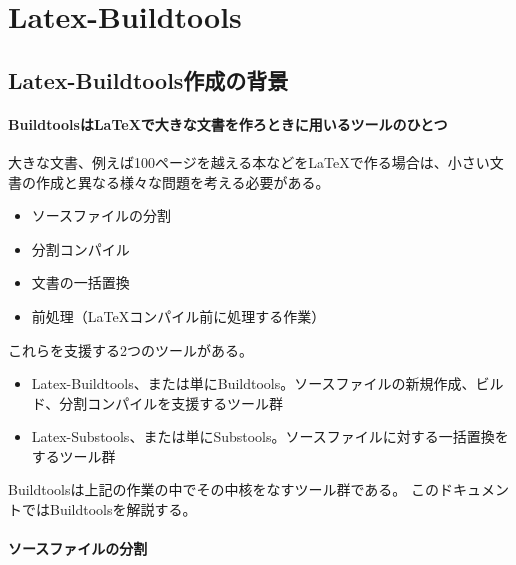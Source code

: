 \hypertarget{latex-buildtools}{%
\section{Latex-Buildtools}\label{latex-buildtools}}

\hypertarget{latex-buildtoolsux4f5cux6210ux306eux80ccux666f}{%
\subsection{Latex-Buildtools作成の背景}\label{latex-buildtoolsux4f5cux6210ux306eux80ccux666f}}

\hypertarget{buildtoolsux306flatexux3067ux5927ux304dux306aux6587ux66f8ux3092ux4f5cux308dux3068ux304dux306bux7528ux3044ux308bux30c4ux30fcux30ebux306eux3072ux3068ux3064}{%
\paragraph{BuildtoolsはLaTeXで大きな文書を作ろときに用いるツールのひとつ}\label{buildtoolsux306flatexux3067ux5927ux304dux306aux6587ux66f8ux3092ux4f5cux308dux3068ux304dux306bux7528ux3044ux308bux30c4ux30fcux30ebux306eux3072ux3068ux3064}}

大きな文書、例えば100ページを越える本などをLaTeXで作る場合は、小さい文書の作成と異なる様々な問題を考える必要がある。

\begin{itemize}
\tightlist
\item
  ソースファイルの分割
\item
  分割コンパイル
\item
  文書の一括置換
\item
  前処理（LaTeXコンパイル前に処理する作業）
\end{itemize}

これらを支援する2つのツールがある。

\begin{itemize}
\tightlist
\item
  Latex-Buildtools、または単にBuildtools。ソースファイルの新規作成、ビルド、分割コンパイルを支援するツール群
\item
  Latex-Substools、または単にSubstools。ソースファイルに対する一括置換をするツール群
\end{itemize}

Buildtoolsは上記の作業の中でその中核をなすツール群である。
このドキュメントではBuildtoolsを解説する。

\hypertarget{ux30bdux30fcux30b9ux30d5ux30a1ux30a4ux30ebux306eux5206ux5272}{%
\paragraph{ソースファイルの分割}\label{ux30bdux30fcux30b9ux30d5ux30a1ux30a4ux30ebux306eux5206ux5272}}

